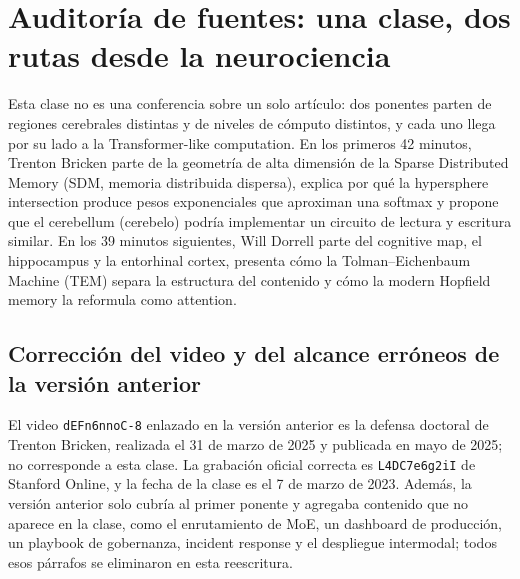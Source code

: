\section{Auditoría de fuentes: una clase, dos rutas desde la neurociencia}

Esta clase no es una conferencia sobre un solo artículo: dos ponentes parten de regiones cerebrales distintas y de niveles de cómputo distintos, y cada uno llega por su lado a la Transformer-like computation. En los primeros 42 minutos, Trenton Bricken parte de la geometría de alta dimensión de la Sparse Distributed Memory (SDM, memoria distribuida dispersa), explica por qué la hypersphere intersection produce pesos exponenciales que aproximan una softmax y propone que el cerebellum (cerebelo) podría implementar un circuito de lectura y escritura similar. En los 39 minutos siguientes, Will Dorrell parte del cognitive map, el hippocampus y la entorhinal cortex, presenta cómo la Tolman--Eichenbaum Machine (TEM) separa la estructura del contenido y cómo la modern Hopfield memory la reformula como attention.

\subsection{Corrección del video y del alcance erróneos de la versión anterior}

El video \texttt{dEFn6nnoC-8} enlazado en la versión anterior es la defensa doctoral de Trenton Bricken, realizada el 31 de marzo de 2025 y publicada en mayo de 2025; no corresponde a esta clase. La grabación oficial correcta es \texttt{L4DC7e6g2iI} de Stanford Online, y la fecha de la clase es el 7 de marzo de 2023. Además, la versión anterior solo cubría al primer ponente y agregaba contenido que no aparece en la clase, como el enrutamiento de MoE, un dashboard de producción, un playbook de gobernanza, incident response y el despliegue intermodal; todos esos párrafos se eliminaron en esta reescritura.

